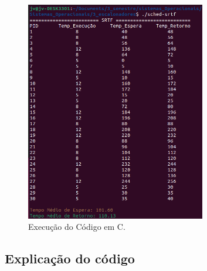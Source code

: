 \documentclass[
	12pt,				%
	openright,			%
	oneside,			%
	a4paper,			%
	chapter=TITLE,		%
	english,			%
	french,				%
	spanish,			%
	brazil				%
	]{abntex2}
\theoremstyle{definition}
\begin{document}
\begin{figure}[H]
    \centering
    \includegraphics[width=0.7\textwidth]{imagens/srtf_run.png}
    \caption{Execução do Código em C.}
    \label{fig:srtf_run}
\end{figure}

\subsection{Explicação do código}
\end{document}
